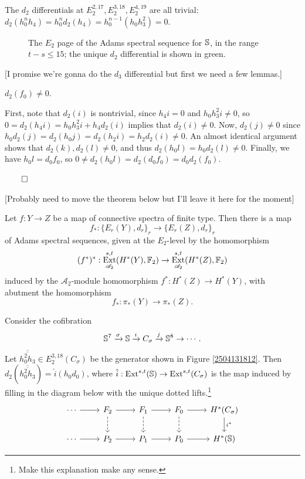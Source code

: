 \documentclass{MetricNotes2023}
\def\bb{\ensuremath\mathbb}
\def\A{\ensuremath{\mathscr{A}_2}}
\DeclareMathOperator{\Ext}{Ext}
\def\done{\begin{flushright}\vspace{-4.35ex}\(\qed\)\end{flushright}}
\begin{document}
The \(d_2\) differentials at \(E_2^{2, 17},  E_2^{3, 18}, E_2^{4, 19}\) are all trivial: \(d_2(h_0^nh_4)=h_0^nd_2(h_4)=h_0^{n-1}(h_0h_3^2)=0\). 

\begin{figure}[H]
\centering

\caption{The \(E_2\) page of the Adams spectral sequence for \(\bb{S}\), in the range \(t-s\leq 15\); the unique \(d_2\) differential is shown in green.}
\end{figure}

[I promise we're gonna do the \(d_3\) differential but first we need a few lemmas.]

\begin{lemma}
\(d_2(f_0)\neq 0\).
\end{lemma}

\begin{ourproof}
First, note that \(d_2(i)\) is nontrivial, since \(h_4i=0\) and \(h_0h_3^2i\neq 0\), so \(0=d_2(h_4i)=h_0h_3^2i+h_4d_2(i)\) implies that \(d_2(i)\neq 0\). Now, \(d_2(j)\neq 0\) since \(h_0d_2(j)=d_2(h_0j)=d_2(h_2i)=h_2d_2(i)\neq 0\). An almost identical argument shows that \(d_2(k), d_2(l)\neq0\), and thus \(d_2(h_0l)=h_0d_2(l)\neq 0\). Finally, we have \(h_0l=d_0f_0\), so \(0\neq d_2(h_0l)=d_2(d_0f_0)=d_0d_2(f_0)\).\done
\end{ourproof}

[Probably need to move the theorem below but I'll leave it here for the moment]

\begin{theorem}\label{2504141019}
Let \(f : Y \to Z\) be a map of connective spectra of finite type. Then there is a map
\[f_* : \{E_r(Y), d_r\}_r \to \{E_r(Z), d_r\}_r\]
of Adams spectral sequences, given at the \(E_2\)-level by the homomorphism
\[(f^*)^* : \Ext_{\A}^{s,t}(H^*(Y), \bb{F}_2) \to \Ext^{s,t}_{\A}(H^*(Z), \bb{F}_2)\]
induced by the \(\A\)-module homomorphism \(f^* : H^*(Z)\to H^*(Y)\), with abutment the homomorphism 
\[f_* : \pi_*(Y) \to \pi_*(Z).\]
\end{theorem}

\begin{lemma}\label{2504131851}
Consider the cofibration
\[\bb{S}^7 \xrightarrow{\sigma} \bb{S} \xrightarrow{i} C_\sigma \xrightarrow{j} \bb{S}^8\to \cdots.\]
Let \(\overline{\overline{h_0^2h_3}}\in E_2^{3,18}(C_\sigma)\) be the generator shown in Figure \ref{2504131812}. Then \(d_2(\overline{\overline{h_0^2h_3}})=\hat i(h_0d_0)\), where \(\hat i : \Ext^{s,t}(\bb{S})\to \Ext^{s,t}(C_\sigma)\) is the map induced by filling in the diagram below with the unique dotted lifts.\footnote{Make this explanation make any sense.}
\[\begin{tikzcd} 
 \cdots \arrow[r, ""] & F_2 \arrow[r, ""] \arrow[d, "", dashrightarrow] & F_1 \arrow[d, "", dashrightarrow] \arrow[r, ""] & F_0 \arrow[d, "", dashrightarrow] \arrow[r, ""] & H^*(C_\sigma) \arrow[d, "i^*"]\\ 
 \cdots \arrow[r, swap, ""]  & P_2 \arrow[r, ""'] & P_1 \arrow[r, ""'] & P_0 \arrow[r, ""'] & H^*(\bb{S})
 \end{tikzcd}\] 
\end{lemma}
\end{document}
